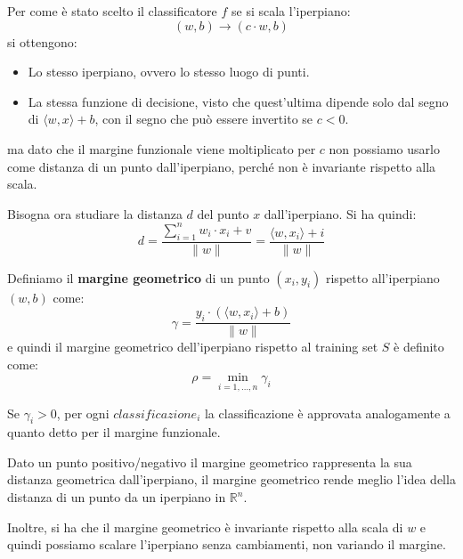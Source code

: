 Per come è stato scelto il classificatore $f$ se si scala l'iperpiano:
\begin{equation}
    (w, b) \to (c \cdot w, b)
\end{equation}
si ottengono:
\begin{itemize}
    \item Lo stesso iperpiano, ovvero lo stesso luogo di punti.
    \item La stessa funzione di decisione, visto che quest'ultima dipende solo dal segno di $\langle w, x \rangle + b$, con il segno che può essere invertito se $c < 0$.
\end{itemize}
ma dato che il margine funzionale viene moltiplicato per $c$ non possiamo usarlo come distanza di un punto dall'iperpiano, perché non è invariante rispetto alla scala.

Bisogna ora studiare la distanza $d$ del punto $x$ dall'iperpiano. Si ha quindi:
\begin{equation}
    d = \frac{\sum_{i = 1} ^ n w_i \cdot x_i + v}{\| w \|} = \frac{\langle w, x_i \rangle + i}{\|  w \|}
\end{equation}
\begin{definizione}
    Definiamo il \textbf{margine geometrico} di un punto $(x_i, y_i)$ rispetto all'iperpiano $(w, b)$ come:
    \begin{equation}
        \gamma = \frac{y_i \cdot (\langle w, x_i \rangle + b)}{\| w \|}
    \end{equation}
    e quindi il margine geometrico dell'iperpiano rispetto al training set $S$ è definito come:
    \begin{equation}
        \rho =  \min_{i = 1, \dots, n} {\gamma}_i
    \end{equation}
\end{definizione}
\begin{teorema}
    Se $\gamma_i > 0$, per ogni $classificazione_i$ la classificazione è approvata analogamente a quanto detto per il margine funzionale.
\end{teorema}
Dato un punto positivo/negativo il margine geometrico rappresenta la sua distanza geometrica dall'iperpiano, il margine geometrico rende meglio l'idea della distanza di un punto da un iperpiano in $\mathbb{R}^n$.

Inoltre, si ha che il margine geometrico è invariante rispetto alla scala di $w$ e quindi possiamo scalare l'iperpiano senza cambiamenti, non variando il margine. 

